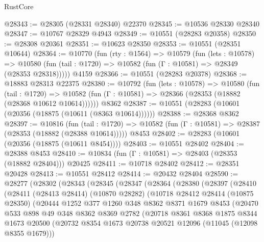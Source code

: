 \begin{lexlean}{RustCore}
\begin{coremodule}
@28343 := @28305 (@28331 @28340) @22370
@28345 := @10536 @28330 @28340
@28347 := @10767 @28329 @4943
@28349 := @10551 (@28283 @20358)
@28350 := @28308 @20361
@28351 := @10623 @28350
@28353 := @10551 (@28351 @10644)
@28364 := @10770
    (fun (rty : @1564) =>
    @10579
      (fun (lets : @10578) =>
      @10580 (fun (tail : @1720) => @10582 (fun (Γ : @10581) => @28349 (@28353 @28318)))))
    @4159
@28366 := @10551 (@28283 @20378)
@28368 := @18883 @28313 @22375
@28380 := @10792
    (fun (lets : @10578) =>
    @10580
      (fun (tail : @1720) =>
      @10582 (fun (Γ : @10581) => @28366 (@28353 (@18882 (@28368 @10612 @10614))))))
    @8362
@28387 := @10551 (@28283 (@10601 (@20356 (@18875 (@10611 (@8363 @10614))))))
@28388 := @28368 @8362
@28397 := @10816
    (fun (tail : @1720) => @10582 (fun (Γ : @10581) => @28387 (@28353 (@18882 (@28388 @10614)))))
    @8453
@28402 := @28283 (@10601 (@20356 (@18875 (@10611 @8454))))
@28403 := @10551 @28402
@28404 := @28388 @8453
@28410 := @10834 (fun (Γ : @10581) => @28403 (@28353 (@18882 @28404))) @20425
@28411 := @10718 @28402
@28412 := @28351 @20428
@28413 := @10551 @28412
@28414 := @20432 @28404
@28590 := @28277
    (@28302
      (@28343
        (@28345
          (@28347
            (@28364
              (@28380
                (@28397
                  (@28410
                    (@28411
                      (@28413 @28414)
                      (@10870 @28282)
                      (@10718
                        @28412
                        @28414
                        (@10875 @28350)
                        (@20444
                          @1252
                          @377
                          @1260
                          @348
                          @8362
                          @8371
                          @1679
                          @8453
                          (@20470
                            @533
                            @898
                            @49
                            @348
                            @8362
                            @8369
                            @2782
                            (@20718
                              @8361
                              @8368
                              @1875
                              @8344
                              @1673
                              @20500
                              (@20732
                                @8354
                                @1673
                                @20738
                                @20521
                                @12096
                                (@11045 (@12098 @8355 @1679)))

\end{coremodule}
\end{lexlean}
